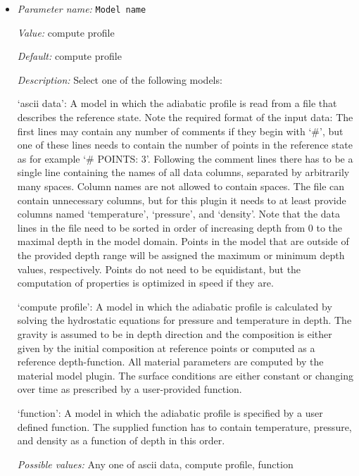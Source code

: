 \begin{itemize}
\item {\it Parameter name:} {\tt Model name}
\label{parameters:Adiabatic conditions model/Model name}


{\it Value:} compute profile


{\it Default:} compute profile


{\it Description:} Select one of the following models:

`ascii data': A model in which the adiabatic profile is read from a file that describes the reference state. Note the required format of the input data: The first lines may contain any number of comments if they begin with `\#', but one of these lines needs to contain the number of points in the reference state as for example `\# POINTS: 3'. Following the comment lines there has to be a single line containing the names of all data columns, separated by arbitrarily many spaces. Column names are not allowed to contain spaces. The file can contain unnecessary columns, but for this plugin it needs to at least provide columns named `temperature', `pressure', and `density'. Note that the data lines in the file need to be sorted in order of increasing depth from 0 to the maximal depth in the model domain. Points in the model that are outside of the provided depth range will be assigned the maximum or minimum depth values, respectively. Points do not need to be equidistant, but the computation of properties is optimized in speed if they are.

`compute profile': A model in which the adiabatic profile is calculated by solving the hydrostatic equations for pressure and temperature in depth. The gravity is assumed to be in depth direction and the composition is either given by the initial composition at reference points or computed as a reference depth-function. All material parameters are computed by the material model plugin. The surface conditions are either constant or changing over time as prescribed by a user-provided function.

`function': A model in which the adiabatic profile is specified by a user defined function. The supplied function has to contain temperature, pressure, and density as a function of depth in this order.


{\it Possible values:} Any one of ascii data, compute profile, function
\end{itemize}



